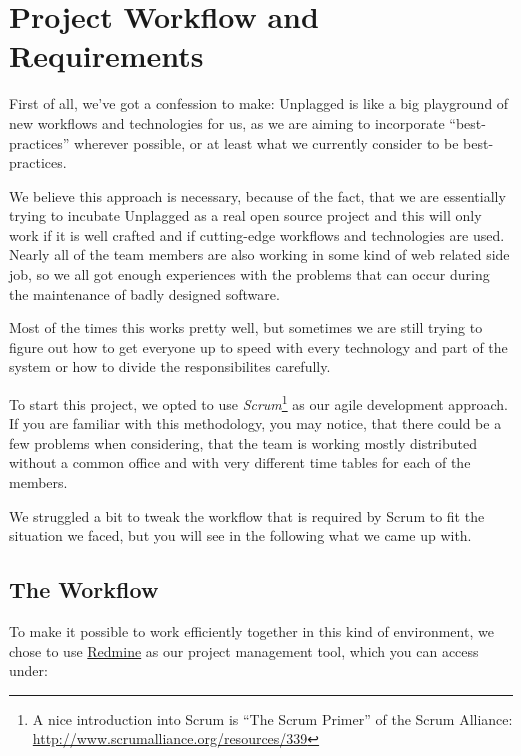 \chapter{Project Workflow and  Requirements}\label{chap:systemRequirements}

First of all, we've got a confession to make: Unplagged is like a big playground of new 
workflows and technologies for us, as we are aiming to incorporate 
\enquote{best-practices} wherever possible, or at least what we currently consider to be best-practices. 

We believe this approach is necessary, because of the 
fact, that we are essentially trying to incubate Unplagged as a real open source project and this will 
only work if
it is well crafted and if cutting-edge workflows and technologies are used. Nearly all of the team members
are also working in some kind of web related side job, so we all got enough experiences with the problems that can 
occur during the maintenance of badly designed software.

Most of the times this works pretty well, but sometimes we are still trying to figure out how to 
get everyone up to speed with every technology and part of the system or how to divide the responsibilites carefully.

To start this project, we opted to use \textit{Scrum}\footnote{A nice introduction into Scrum is \enquote{The Scrum Primer} 
of the Scrum Alliance: \url{http://www.scrumalliance.org/resources/339}} 
as our agile development approach. If you are familiar with this
methodology, you may notice, that there could be a few problems when considering, that the team is working mostly 
distributed
without a common office and with very different time tables for each of the members.

We struggled a bit to tweak the workflow that is required by Scrum to fit the situation we faced, but you will see in the
following what we came up with.

\section{The Workflow}

To make it possible to work efficiently together in this kind of environment, we chose to use
\href{http://www.redmine.org/}{Redmine} as our project management tool, which you can access under:

